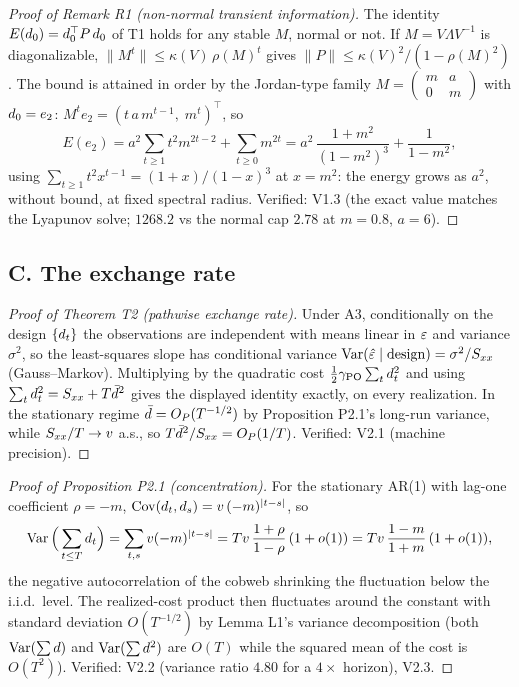 \documentclass[11pt]{article}
\begin{document}
\begin{proof}[Proof of Remark R1 (non-normal transient information)]
The identity $E(d_0) = d_0^\top P\,d_0$ of T1 holds for any stable
$M$, normal or not. If $M = V\Lambda V^{-1}$ is diagonalizable,
$\|M^t\| \le \kappa(V)\,\rho(M)^t$ gives
$\|P\| \le \kappa(V)^2/(1-\rho(M)^2)$. The bound is attained in order by the
Jordan-type family $M = \begin{pmatrix} m & a \\ 0 & m\end{pmatrix}$ with
$d_0 = e_2$: $M^t e_2 = (t\,a\,m^{t-1},\; m^t)^\top$, so
\[
E(e_2) = a^2 \sum_{t\ge 1} t^2 m^{2t-2} + \sum_{t \ge 0} m^{2t}
 = a^2\,\frac{1+m^2}{(1-m^2)^3} + \frac{1}{1-m^2},
\]
using $\sum_{t\ge1} t^2 x^{t-1} = (1+x)/(1-x)^3$ at $x = m^2$: the energy
grows as $a^2$, without bound, at fixed spectral radius. Verified: V1.3
(the exact value matches the Lyapunov solve; $1268.2$ vs the normal cap
$2.78$ at $m = 0.8$, $a = 6$).
\end{proof}

\subsection*{C. The exchange rate}

\begin{proof}[Proof of Theorem T2 (pathwise exchange rate)]
Under A3, conditionally on the design $\{d_t\}$ the observations are
independent with means linear in $\varepsilon$ and variance $\sigma^2$, so the
least-squares slope has conditional variance
$\operatorname{Var}(\hat{\varepsilon} \mid \mathrm{design}) = \sigma^2/S_{xx}$ (Gauss--Markov).
Multiplying by the quadratic cost $\tfrac{1}{2}\gamma_{\mathrm{PO}} \sum_t d_t^2$ and
using $\sum_t d_t^2 = S_{xx} + T\bar{d}^2$ gives the displayed identity
exactly, on every realization. In the stationary regime
$\bar{d} = O_P(T^{-1/2})$ by Proposition P2.1's long-run variance, while
$S_{xx}/T \to v$ a.s., so $T\bar{d}^2/S_{xx} = O_P(1/T)$. Verified: V2.1
(machine precision).
\end{proof}

\begin{proof}[Proof of Proposition P2.1 (concentration)]
For the stationary AR(1) with lag-one coefficient $\rho = -m$,
$\operatorname{Cov}(d_t, d_s) = v\,(-m)^{|t-s|}$, so
\[
\operatorname{Var}\Big(\sum_{t \le T}d_t\Big) = \sum_{t,s} v (-m)^{|t-s|}
 = T v\,\frac{1+\rho}{1-\rho}\,(1+o(1)) = T v\,\frac{1-m}{1+m}\,(1+o(1)),
\]
the negative autocorrelation of the cobweb shrinking the fluctuation below
the i.i.d.\ level. The realized-cost product then fluctuates around the
constant with standard deviation $O(T^{-1/2})$ by Lemma L1's variance
decomposition (both $\operatorname{Var}(\sum d)$ and $\operatorname{Var}(\sum d^2)$ are $O(T)$
while the squared mean of the cost is $O(T^2)$). Verified: V2.2 (variance
ratio $4.80$ for a $4\times$ horizon), V2.3.
\end{proof}
\end{document}
